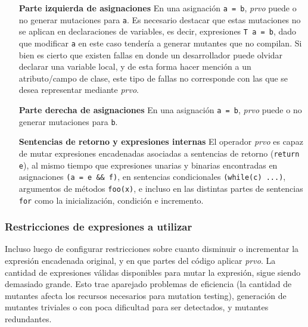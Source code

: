 \begin{enumerate}[leftmargin=.75cm,align=left]
	\item[\textbf{Parte izquierda de asignaciones}] En una asignaci\'on \texttt{a = b}, \emph{prvo} puede o no generar mutaciones para \texttt{a}. Es necesario destacar que estas mutaciones no se aplican en declaraciones de variables, es decir, expresiones \texttt{T a = b}, dado que modificar \texttt{a} en este caso tender\'ia a generar mutantes que no compilan. Si bien es cierto que existen fallas en donde un desarrollador puede olvidar declarar una variable local, y de esta forma hacer menci\'on a un atributo/campo de clase, este tipo de fallas no corresponde con las que se desea representar mediante \emph{prvo}.
	
	\item[\textbf{Parte derecha de asignaciones}] En una asignaci\'on \texttt{a = b}, \emph{prvo} puede o no generar mutaciones para \texttt{b}.
	
	\item[\textbf{Sentencias de retorno y expresiones internas}] El operador \emph{prvo} es capaz de mutar expresiones encadenadas asociadas a sentencias de retorno (\texttt{return e}), al mismo tiempo que expresiones unarias y binarias encontradas en asignaciones \texttt{(a = e \&\& f)}, en sentencias condicionales \texttt{(while(c) ...)}, argumentos de m\'etodos \texttt{foo(x)}, e incluso en las distintas partes de sentencias \texttt{for} como la inicializaci\'on, condici\'on e incremento.
\end{enumerate}

\subsubsection{Restricciones de expresiones a utilizar}

Incluso luego de configurar restricciones sobre cuanto disminuir o incrementar la expresi\'on encadenada original, y en que partes del c\'odigo aplicar \emph{prvo}. La cantidad de expresiones v\'alidas disponibles para mutar la expresi\'on, sigue siendo demasiado grande. Esto trae aparejado problemas de eficiencia (la cantidad de mutantes afecta los recursos necesarios para mutation testing), generaci\'on de mutantes triviales o con poca dificultad para ser detectados, y mutantes redundantes.

